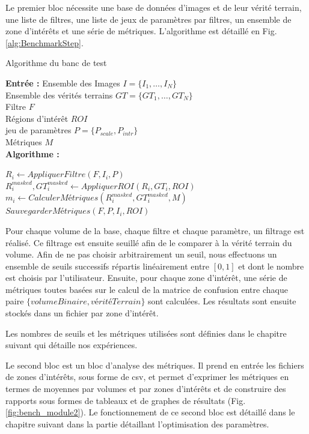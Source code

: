 Le premier bloc nécessite une base de données d'images et de leur vérité terrain, une liste de filtres, une liste de jeux de paramètres par filtres, un ensemble de zone d'intérêts et une série de métriques. L'algorithme est détaillé en Fig. \ref{alg:BenchmarkStep}.

\begin{algorithm}[h]
  \caption{Algorithme du banc de test}\label{alg:BenchmarkStep}
      \textbf{Entrée :}
      Ensemble des Images $I=\{I_1,\ldots,I_N\}$ \\
      Ensemble des vérités terrains $GT=\{GT_1,\ldots,GT_N\}$\\
      Filtre $F$\\
      Régions d'intérêt $ROI$\\
      jeu de paramètres  $P=\{ P_{scale},P_{intr} \} $\\ Métriques $M$\\
      \textbf{Algorithme :}
      \begin{algorithmic}
              \State $R_{i} \gets AppliquerFiltre(F,I_i,P)$
              \State $R_{i}^{masked},GT_{i}^{masked} \gets AppliquerROI( R_{i},GT_{i}, ROI ) $
              \State $m_{i} \gets CalculerMétriques(R_{i}^{masked}, GT_{i}^{masked}, M)$
              \State $SauvegarderMétriques(F,P,I_i,ROI)$
          \EndFor
      \end{algorithmic}
  \end{algorithm}

Pour chaque volume de la base, chaque filtre et chaque paramètre, un filtrage est réalisé. Ce filtrage est ensuite seuillé afin de le comparer à la vérité terrain du volume. Afin de ne pas choisir arbitrairement un seuil, nous effectuons un ensemble de seuils successifs répartis linéairement entre $[0,1]$ et dont le nombre est choisis par l'utilisateur. Ensuite, pour chaque zone d'intérêt, une série de métriques toutes basées sur le calcul de la matrice de confusion entre chaque paire $\{volume Binaire, vérité Terrain\}$ sont calculées. Les résultats sont ensuite stockés dans un fichier par zone d'intérêt.

Les nombres de seuils et les métriques utilisées sont définies dans le chapitre suivant qui détaille nos expériences. 

Le second bloc est un bloc d'analyse des métriques. Il prend en entrée les fichiers de zones d'intérêts, sous forme de csv, et permet d'exprimer les métriques en termes de moyennes par volumes et par zones d'intérêts et de construire des rapports sous formes de tableaux et de graphes de résultats (Fig. \ref{fig:bench_module2}). Le fonctionnement de ce second bloc est détaillé dans le chapitre suivant dans la partie détaillant l'optimisation des paramètres. 

